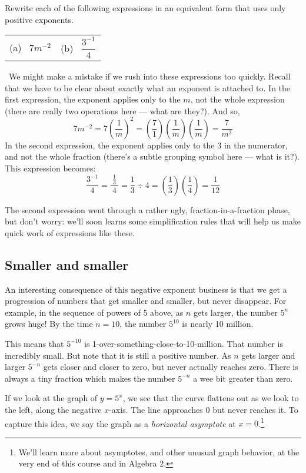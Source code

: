 \begin{boxex}
Rewrite each of the following expressions in an equivalent form that uses only positive exponents.
\begin{center}
\begin{tabularx}{0.4\textwidth}{XX}
(a)~ $7m^{-2}$
&
(b)~ $\dfrac{3^{-1}}{~4~}$
\end{tabularx}
\end{center}

\exsoln\ We might make a mistake if we rush into these expressions too quickly. Recall that we have to be clear about exactly what an exponent is attached to. In the first expression, the exponent applies only to the $m$, not the whole expression (there are really two operations here --- what are they?). And so,
\[7m^{-2} = 7\left(\frac{1}{m}\right)^2 = \left(\frac{7}{1}\right)\left(\frac{1}{m}\right)\left(\frac{1}{m}\right) = \frac{7}{m^2}\]
In the second expression, the exponent applies only to the 3 in the numerator, and not the whole fraction (there's a subtle grouping symbol here --- what is it?). This expression becomes:
\[\dfrac{3^{-1}}{~4~} = \dfrac{\tfrac{1}{3}}{~4~} = \frac{1}{3}\div{4} = \left(\frac{1}{3}\right)\left(\frac{1}{4}\right) = \frac{1}{12}\]
\end{boxex}

The second expression went through a rather ugly, fraction-in-a-fraction phase, but don't worry: we'll soon learns some simplification rules that will help us make quick work of expressions like these.

\subsection{Smaller and smaller}

An interesting consequence of this negative exponent business is that we get a progression of numbers that get smaller and smaller, but never disappear. For example, in the sequence of powers of 5 above, as $n$ gets larger, the number $5^n$ grows huge! By the time $n=10$, the number $5^{10}$ is nearly 10 million.

This means that $5^{-10}$ is 1-over-something-close-to-10-million. That number is incredibly small. But note that it is still a positive number. As $n$ gets larger and larger $5^{-n}$ gets closer and closer to zero, but never actually reaches zero. There is always a tiny fraction which makes the number $5^{-n}$ a wee bit greater than zero.

If we look at the graph of $y=5^x$, we see that the curve flattens out as we look to the left, along the negative $x$-axis. The line approaches 0 but never reaches it. To capture this idea, we say the graph as a \textit{horizontal asymptote} at $x=0$.\footnote{We'll learn more about asymptotes, and other unusual graph behavior, at the very end of this course and in Algebra 2.}


